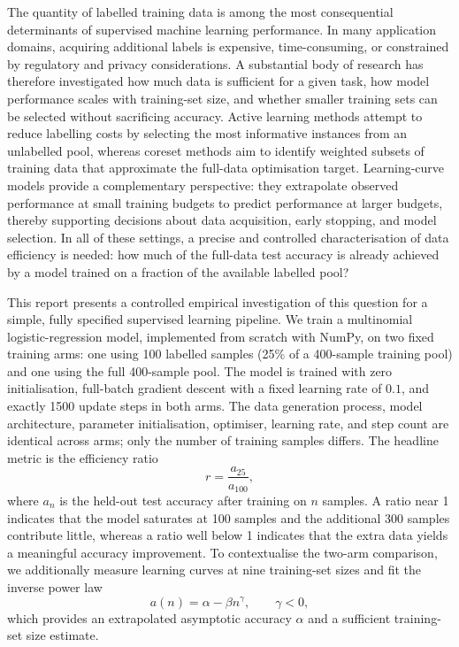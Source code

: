 \documentclass{article}
\begin{document}
The quantity of labelled training data is among the most consequential determinants of supervised machine learning performance. In many application domains, acquiring additional labels is expensive, time-consuming, or constrained by regulatory and privacy considerations. A substantial body of research has therefore investigated how much data is sufficient for a given task, how model performance scales with training-set size, and whether smaller training sets can be selected without sacrificing accuracy. Active learning methods attempt to reduce labelling costs by selecting the most informative instances from an unlabelled pool, whereas coreset methods aim to identify weighted subsets of training data that approximate the full-data optimisation target. Learning-curve models provide a complementary perspective: they extrapolate observed performance at small training budgets to predict performance at larger budgets, thereby supporting decisions about data acquisition, early stopping, and model selection. In all of these settings, a precise and controlled characterisation of data efficiency is needed: how much of the full-data test accuracy is already achieved by a model trained on a fraction of the available labelled pool?

This report presents a controlled empirical investigation of this question for a simple, fully specified supervised learning pipeline. We train a multinomial logistic-regression model, implemented from scratch with NumPy, on two fixed training arms: one using 100 labelled samples (25\% of a 400-sample training pool) and one using the full 400-sample pool. The model is trained with zero initialisation, full-batch gradient descent with a fixed learning rate of \(0.1\), and exactly 1500 update steps in both arms. The data generation process, model architecture, parameter initialisation, optimiser, learning rate, and step count are identical across arms; only the number of training samples differs. The headline metric is the efficiency ratio
\begin{equation}
r = \frac{a_{25}}{a_{100}},
\end{equation}
where \(a_n\) is the held-out test accuracy after training on \(n\) samples. A ratio near 1 indicates that the model saturates at 100 samples and the additional 300 samples contribute little, whereas a ratio well below 1 indicates that the extra data yields a meaningful accuracy improvement. To contextualise the two-arm comparison, we additionally measure learning curves at nine training-set sizes and fit the inverse power law
\begin{equation}
a(n) = \alpha - \beta n^{\gamma}, \qquad \gamma < 0,
\end{equation}
which provides an extrapolated asymptotic accuracy \(\alpha\) and a sufficient training-set size estimate.
\end{document}

